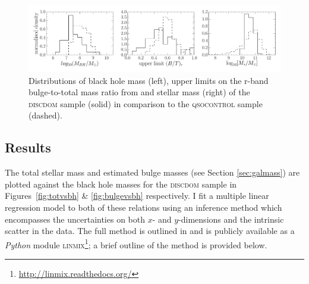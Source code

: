 {\begin{figure}
\centering
\includegraphics[width=\textwidth]{agn/diskdom_mbh_btot_stellar_mass_distributions.pdf}
\caption[Galaxy and black hole properties of the \textsc{discdom} sample in comparison to the \textsc{qsocontrol} sample]{Distributions of black hole mass (left), upper limits on the r-band bulge-to-total mass ratio from \citet[][middle]{simard11} and stellar mass (right) of the \textsc{discdom} sample (solid) in comparison to the \textsc{qsocontrol} sample (dashed).}
\label{fig:discdomdist}
\end{figure}



%
%  
\subsection{Results}\label{sec:results}
%
% 



The total stellar mass and estimated bulge masses (see Section \ref{sec:galmass}) are plotted against the black hole masses for the \textsc{discdom} sample in Figures~\ref{fig:totvsbh} \& \ref{fig:bulgevsbh} respectively. I fit a multiple linear regression model to both of these relations using an inference method which encompasses the uncertainties on both $x$- and $y$-dimensions and the intrinsic scatter in the data. The full method is outlined in \citet{kelly07} and is publicly available as a \emph{Python} module \textsc{linmix}\footnote{\url{http://linmix.readthedocs.org/}}; a brief outline of the method is provided below. 

}
